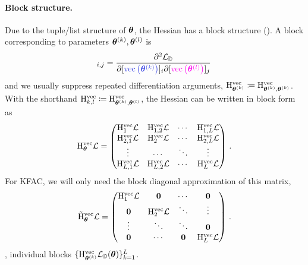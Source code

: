 \paragraph{Block structure.} Due to the tuple/list structure of ${\bm{\theta}}$, the Hessian has a block structure ().
A block corresponding to parameters ${\bm{\theta}}^{(k)}, {\bm{\theta}}^{(l)}$ is
\begin{align*}
  [\hess_{\colored{\vtheta^{(k)}}, \colored[VectorPink]{\vtheta^{(l)}}}^{\vec} \gL_{\sD}]_{i,j}
  =
  \frac{\partial^2 \gL_{\sD}}{\partial [\colored{\vec\left(\vtheta^{(k)}\right)}]_i \partial [\colored[VectorPink]{\vec\left(\vtheta^{(l)}\right)}]_j}\,
\end{align*}
and we usually suppress repeated differentiation arguments, $\mathrm{H}_{{\bm{\theta}}^{(k)}}^{\operatorname{vec}} \coloneqq \mathrm{H}_{{\bm{\theta}}^{(k)}, {\bm{\theta}}^{(k)}}^{\operatorname{vec}}$.
With the shorthand $\mathrm{H}_{k,l}^{\operatorname{vec}} \coloneq \mathrm{H}_{{\bm{\theta}}^{(k)}, {\bm{\theta}}^{(l)}}^{\operatorname{vec}}$,
the Hessian can be written in block form as
\begin{align*}
  \mathrm{H}_{{\bm{\theta}}}^{\operatorname{vec}} {\mathcal{L}}
  =
  \begin{pmatrix}
    \mathrm{H}_1^{\operatorname{vec}} {\mathcal{L}}
    &
      \mathrm{H}_{1, 2}^{\operatorname{vec}} {\mathcal{L}}
    &
      \cdots
    &
      \mathrm{H}_{1, L}^{\operatorname{vec}} {\mathcal{L}}
    \\
    \mathrm{H}_{2, 1}^{\operatorname{vec}} {\mathcal{L}}
    &
      \mathrm{H}_2^{\operatorname{vec}} {\mathcal{L}}
    &
      \cdots
    &
      \mathrm{H}_{2, L}^{\operatorname{vec}} {\mathcal{L}}
    \\
    \vdots & \cdots & \ddots & \vdots
    \\
    \mathrm{H}_{L, 1}^{\operatorname{vec}} {\mathcal{L}}
    &
      \mathrm{H}_{L, 2}^{\operatorname{vec}} {\mathcal{L}}
    &
      \cdots
    &
      \mathrm{H}_L^{\operatorname{vec}} {\mathcal{L}}
  \end{pmatrix}\,.
\end{align*}
For KFAC, we will only need the block diagonal approximation of this matrix,
\begin{align*}
  \tilde{\mathrm{H}}_{{\bm{\theta}}}^{\operatorname{vec}} {\mathcal{L}}
  =
  \begin{pmatrix}
    \mathrm{H}_1^{\operatorname{vec}} {\mathcal{L}} & {\bm{0}} & \cdots & {\bm{0}}
    \\
    {\bm{0}} & \mathrm{H}_2^{\operatorname{vec}} {\mathcal{L}} & \ddots & \vdots
    \\
    \vdots & \ddots & \ddots & {\bm{0}}
    \\
    {\bm{0}} & \cdots & {\bm{0}} & \mathrm{H}_L^{\operatorname{vec}} {\mathcal{L}}
  \end{pmatrix}\,.
\end{align*}
\ie, individual blocks $\{ \mathrm{H}_{{\bm{\theta}}^{(k)}}^{\operatorname{vec}} {\mathcal{L}}_{{\mathbb{D}}}({\bm{\theta}})\}_{k=1}^L$.
